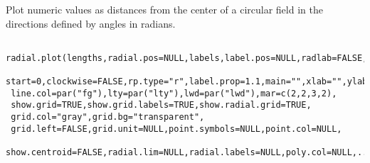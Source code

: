 \begin{Description}\relax
Plot numeric values as distances from the center of a circular field in the
directions defined by angles in radians.
\end{Description}
\begin{Usage}
\begin{verbatim}
 radial.plot(lengths,radial.pos=NULL,labels,label.pos=NULL,radlab=FALSE,
 start=0,clockwise=FALSE,rp.type="r",label.prop=1.1,main="",xlab="",ylab="",
 line.col=par("fg"),lty=par("lty"),lwd=par("lwd"),mar=c(2,2,3,2),
 show.grid=TRUE,show.grid.labels=TRUE,show.radial.grid=TRUE,
 grid.col="gray",grid.bg="transparent",
 grid.left=FALSE,grid.unit=NULL,point.symbols=NULL,point.col=NULL,
 show.centroid=FALSE,radial.lim=NULL,radial.labels=NULL,poly.col=NULL,...)
\end{verbatim}
\end{Usage}
